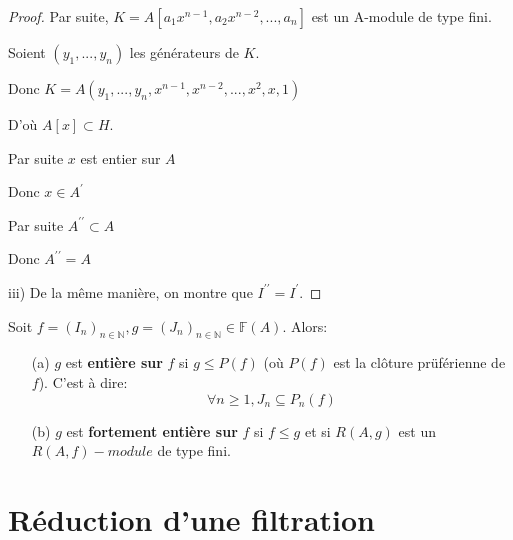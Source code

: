 \begin{proof}
	Par suite, $K=A[a_{1}x^{n-1},a_{2}x^{n-2},...,a_{n}]$ est un A-module de
	type fini.
	
	Soient $(y_{1},...,y_{n})$ les générateurs de $K.$
	
	Donc $K=A(y_{1},...,y_{n},x^{n-1},x^{n-2},...,x^{2},x,1)$
	
	D'où $A[x]\subset H.$
	
	Par suite $x$ est entier sur $A$
	
	Donc $x\in A^{\prime }$
	
	Par suite $A^{\prime \prime }\subset A$
	
	Donc  $A^{\prime \prime }=A$
	
	iii) De la m\^{e}me manière, on montre que $I^{\prime \prime }=I^{\prime
	}.$
\end{proof}
\begin{madefinition}
	Soit $f=(I_n)_{n \in \mathbb{N}} , g = (J_n)_{n \in \mathbb{N}}\in \mathbb{F}(A)$.  Alors:\\
	\begin{enumerate}
		\item[(a)]$g$ est \textbf{entière sur} $f$ si $g \leqslant P(f)$ (où $P(f)$ est la clôture prüférienne de $f$). C'est à dire:
		\[\forall n \geqslant 1, J_n \subseteq P_{n}(f) \]
		\item[(b)]$g$ est \textbf{fortement entière sur} $f$ si $f \leqslant g$ et si $R(A,g)$ est un $R(A,f)-module$ de type fini.
	\end{enumerate}
\end{madefinition}
\section{Réduction d'une filtration}

